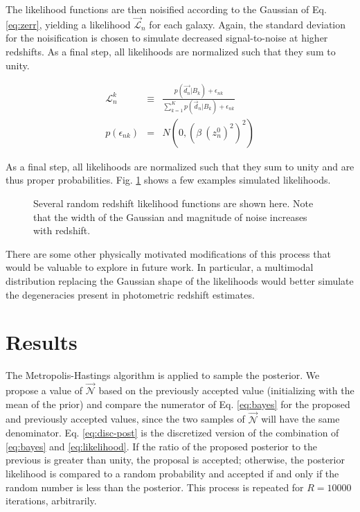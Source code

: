 \documentclass[12pt, onecolumn]{emulateapj}
\begin{document}
The likelihood functions are then noisified according to the Gaussian of Eq. \ref{eq:zerr}, yielding a likelihood $\vec{\mathcal{L}}_{n}$ for each galaxy.  Again, the standard deviation for the noisification is chosen to simulate decreased signal-to-noise at higher redshifts.  As a final step, all likelihoods are normalized such that they sum to unity.

\begin{mathletters}
\begin{eqnarray}
\label{eq:zerr}
\mathcal{L}_{n}^{k} &\equiv& \frac{p(\vec{d_{n}}|B_{k})+\epsilon_{nk}}{\sum_{k=1}^{K}p(\vec{d}_{n}|B_{k})+\epsilon_{nk}}\\
p(\epsilon_{nk}) &=& N(0,(\beta\ (z_{n}^{0})^{2})^{2})\nonumber
\end{eqnarray}
\end{mathletters}

As a final step, all likelihoods are normalized such that they sum to unity and are thus proper probabilities.  Fig. \ref{fig:pzs} shows a few examples simulated likelihoods.

\begin{figure}
\label{fig:pzs}
\caption{Several random redshift likelihood functions are shown here.  Note that the width of the Gaussian and magnitude of noise increases with redshift.}
\end{figure}

There are some other physically motivated modifications of this process that would be valuable to explore in future work.  In particular, a multimodal distribution replacing the Gaussian shape of the likelihoods would better simulate the degeneracies present in photometric redshift estimates.

\section{Results}

The Metropolis-Hastings algorithm is applied to sample the posterior.  We propose a value of $\vec{\mathcal{N}}$ based on the previously accepted value (initializing with the mean of the prior) and compare the numerator of Eq. \ref{eq:bayes} for the proposed and previously accepted values, since the two samples of $\vec{\mathcal{N}}$ will have the same denominator.  Eq. \ref{eq:disc-post} is the discretized version of the combination of \ref{eq:bayes} and \ref{eq:likelihood}.  If the ratio of the proposed posterior to the previous is greater than unity, the proposal is accepted; otherwise, the posterior likelihood is compared to a random probability and accepted if and only if the random number is less than the posterior.  This process is repeated for $R=10000$ iterations, arbitrarily.
\end{document}
